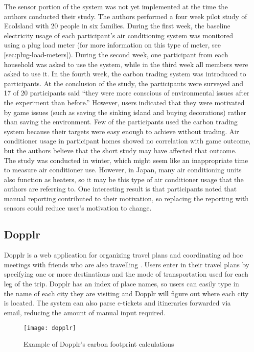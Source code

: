 The sensor portion of the system was not yet implemented at the time the authors conducted their study. The authors performed a four week pilot study of EcoIsland with 20 people in six families. During the first week, the baseline electricity usage of each participant's air conditioning system was monitored using a plug load meter (for more information on this type of meter, see \autoref{sec:plug-load-meters}). During the second week, one participant from each household was asked to use the system, while in the third week all members were asked to use it. In the fourth week, the carbon trading system was introduced to participants. At the conclusion of the study, the participants were surveyed and 17 of 20 participants said ``they were more conscious of environmental issues after the experiment than before.'' However, users indicated that they were motivated by game issues (such as saving the sinking island and buying decorations) rather than saving the environment. Few of the participants used the carbon trading system because their targets were easy enough to achieve without trading. Air conditioner usage in participant homes showed no correlation with game outcome, but the authors believe that the short study may have affected that outcome. The study was conducted in winter, which might seem like an inappropriate time to measure air conditioner use. However, in Japan, many air conditioning units also function as heaters, so it may be this type of air conditioner usage that the authors are referring to. One interesting result is that participants noted that manual reporting contributed to their motivation, so replacing the reporting with sensors could reduce user's motivation to change.

\subsection{Dopplr}
\label{sec:dopplr}
Dopplr is a web application for organizing travel plans and coordinating ad hoc meetings with friends who are also travelling \cite{dopplr-website}. Users enter in their travel plans by specifying one or more destinations and the mode of transportation used for each leg of the trip. Dopplr has an index of place names, so users can easily type in the name of each city they are visiting and Dopplr will figure out where each city is located. The system can also parse e-tickets and itineraries forwarded via email, reducing the amount of manual input required.

\begin{figure}[htb]
	\centering
		\texttt{[image: dopplr]}
		\caption{Example of Dopplr's carbon footprint calculations}
		\label{fig:dopplr}
\end{figure}


